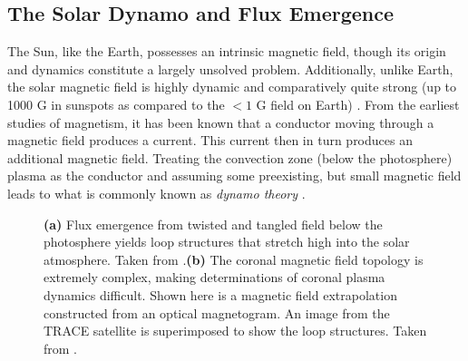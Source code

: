 \subsection{The Solar Dynamo and Flux Emergence}
\label{subsec:dynamo_flux}
\par The Sun, like the Earth, possesses an intrinsic magnetic field, though its origin and dynamics constitute a largely unsolved problem. Additionally, unlike Earth, the solar magnetic field is highly dynamic and comparatively quite strong (up to 1000 G in sunspots as compared to the $<1$ G field on Earth) \citep{aschwanden_physics_2006}. From the earliest studies of magnetism, it has been known that a conductor moving through a magnetic field produces a current. This current then in turn produces an additional magnetic field. Treating the convection zone (below the photosphere) plasma as the conductor and assuming some preexisting, but small magnetic field leads to what is commonly known as \textit{dynamo theory} \citep{golub_solar_2010}.
%
\begin{figure}[htbp]
	\centering
	\caption{\textbf{(a)} Flux emergence from twisted and tangled field below the photosphere yields loop structures that stretch high into the solar atmosphere. Taken from \citet{gold_magnetic_1964}.\textbf{(b)} The coronal magnetic field topology is extremely complex, making determinations of coronal plasma dynamics difficult. Shown here is a magnetic field extrapolation constructed from an optical magnetogram. An image from the TRACE satellite is superimposed to show the loop structures. Taken from \citet{reale_coronal_2010}.}
	\label{fig:complex_fields}
\end{figure}
